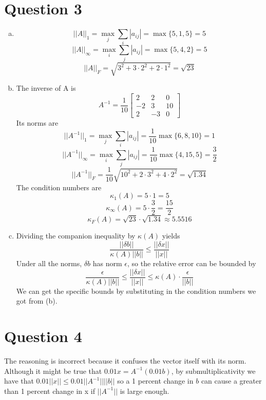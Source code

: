 \documentclass{article}
\newcommand{\inv}[1]{#1^{-1}}
\newcommand{\abs}[1]{|#1|}
\newcommand{\norm}[1]{||#1||}
\begin{document}
\section*{Question 3}
\begin{enumerate}[(a)]
    \item \[
        \norm{A}_1 = \max_{j} \sum_i \abs{a_{ij}} = \max \{5, 1, 5\} = 5
    \]
    \[
        \norm{A}_\infty = \max_{i} \sum_j \abs{a_{ij}} = \max \{5, 4, 2\} = 5
    \]
    \[
        \norm{A}_F =  \sqrt{3^2 + 3\cdot2^2 + 2\cdot 1^2} = \sqrt{23}
    \]
    \item The inverse of A is 
    \[  
        \inv{A} = \frac{1}{10} 
        \begin{bmatrix}
            2 & 2 & 0 \\
            -2 & 3 & 10 \\
            2 & -3 & 0
        \end{bmatrix}
    \]
    Its norms are
    \[
        \norm{\inv{A}}_1 = \max_{j} \sum_i \abs{a_{ij}} = \frac{1}{10}\max \{6, 8, 10\} = 1
    \]
    \[
        \norm{\inv{A}}_\infty = \max_{i} \sum_j \abs{a_{ij}} = \frac{1}{10}\max \{4, 15, 5\} = \frac{3}{2}
    \]
    \[
        \norm{\inv{A}}_F =  \frac{1}{10}\sqrt{10^2 + 2\cdot3^2 + 4\cdot 2^2} = \sqrt{1.34}
    \]
    The condition numbers are 
    \[
        \kappa_1(A) = 5\cdot 1 = 5
    \]
    \[
        \kappa_\infty(A) = 5\cdot\frac{3}{2} = \frac{15}{2}
    \]
    \[
        \kappa_F(A) = \sqrt{23}\cdot \sqrt{1.34} \approx 5.5516
    \]
    \item Dividing the companion inequality by $\kappa(A)$ yields 
    \[
        \frac{\norm{\delta b}}{\kappa(A)\norm{b}} \leq \frac{\norm{\delta x}}{\norm{x}}
    \]
    Under all the norms, $\delta b$ has norm $\epsilon$, so the relative error can be bounded by 
    \[
        \frac{\epsilon}{\kappa(A)\norm{b}} \leq \frac{\norm{\delta x}}{\norm{x}} \leq \kappa(A) \cdot \frac{\epsilon}{\norm{b}}
    \]
    We can get the specific bounds by substituting in the condition numbers we got from (b).
\end{enumerate}

\section*{Question 4}
    The reasoning is incorrect because it confuses the vector itself with its norm.
    Although it might be true that $0.01x = \inv{A}(0.01b)$,
    by submultiplicativity we have that $0.01\norm{x} \leq 0.01\norm{\inv{A}}\norm{b}$
    so a 1 percent change in $b$ can cause a greater than 1 percent change in x 
    if $\norm{\inv{A}}$ is large enough.
\end{document}
